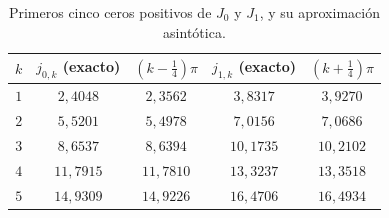 \begin{table}[H]
\centering
\small
\caption{Primeros cinco ceros positivos de $J_0$ y $J_1$, y su aproximación asintótica.}
\label{tab:s5-ceros}
\begin{tabular}{|c|c|c|c|c|}
\hline
\rowcolor{bbe!15}$k$ & $j_{0,k}$ (exacto) & $(k-\frac14)\pi$ & $j_{1,k}$ (exacto) & $(k+\frac14)\pi$ \\ \hline
$1$ & $2{,}4048$ & $2{,}3562$ & $3{,}8317$ & $3{,}9270$ \\ \hline
$2$ & $5{,}5201$ & $5{,}4978$ & $7{,}0156$ & $7{,}0686$ \\ \hline
$3$ & $8{,}6537$ & $8{,}6394$ & $10{,}1735$ & $10{,}2102$ \\ \hline
$4$ & $11{,}7915$ & $11{,}7810$ & $13{,}3237$ & $13{,}3518$ \\ \hline
$5$ & $14{,}9309$ & $14{,}9226$ & $16{,}4706$ & $16{,}4934$ \\ \hline
\end{tabular}
\end{table}
 
